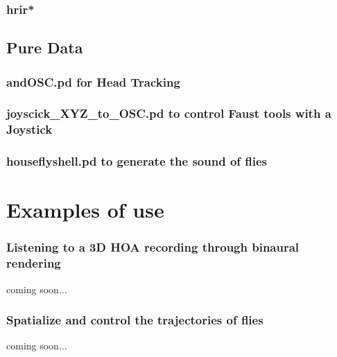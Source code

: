 \documentclass[10pt,a4paper]{article}
\begin{document}
\subsubsection{hrir*}


\subsection{Pure Data}
\subsubsection{andOSC.pd for Head Tracking}
\label{sec:andOSC}
\subsubsection{joyscick\_XYZ\_to\_OSC.pd to control Faust tools with a Joystick}
\subsubsection{houseflyshell.pd to generate the sound of flies}

\section{Examples of use}
\subsubsection{Listening to a 3D HOA recording through binaural rendering}
coming soon...
\subsubsection{Spatialize and control the trajectories of flies}
coming soon...


\end{document}
